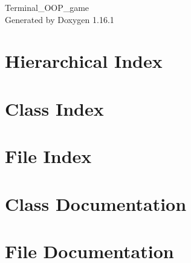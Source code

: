 \documentclass[twoside]{book}
\newcommand{\+}{\discretionary{\mbox{\scriptsize$\hookleftarrow$}}{}{}}
\newcommand{\clearemptydoublepage}{%
    \newpage{\pagestyle{empty}\cleardoublepage}%
  }
\begin{document}
  \raggedbottom
    \hypersetup{pageanchor=false,
                bookmarksnumbered=true,
                pdfencoding=unicode
               }
  \begin{titlepage}
  \vspace*{7cm}
  \begin{center}%
  {\Large Terminal\+\_\+\+OOP\+\_\+game}\\
  \vspace*{1cm}
  {\large Generated by Doxygen 1.16.1}\\
  \end{center}
  \end{titlepage}
  \clearemptydoublepage
  \tableofcontents
  \clearemptydoublepage
  \hypersetup{pageanchor=true}
\chapter{Hierarchical Index}

\chapter{Class Index}

\chapter{File Index}

\chapter{Class Documentation}





\chapter{File Documentation}
















  \backmatter
  \newpage
  \clearemptydoublepage
  \printindex
\end{document}
